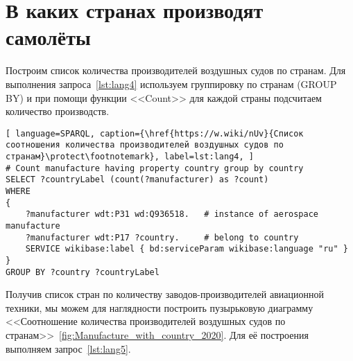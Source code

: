 \section{В каких странах производят самолёты}

Построим список количества производителей воздушных судов по странам. Для выполнения запроса~\ref{lst:lang4} используем группировку по странам (GROUP BY) и при помощи функции <<Count>> для каждой страны подсчитаем количество производств.

\label{aircraft_question_3}

\begin{lstlisting}[ language=SPARQL, caption={\href{https://w.wiki/nUv}{Список соотношения количества производителей воздушных судов по странам}\protect\footnotemark}, label=lst:lang4, ]
# Count manufacture having property country group by country
SELECT ?countryLabel (count(?manufacturer) as ?count)
WHERE
{
    ?manufacturer wdt:P31 wd:Q936518.   # instance of aerospace manufacture
    ?manufacturer wdt:P17 ?country.     # belong to country
    SERVICE wikibase:label { bd:serviceParam wikibase:language "ru" }
}
GROUP BY ?country ?countryLabel
\end{lstlisting}


Получив список стран по количеству заводов-производителей авиационной техники, мы можем для наглядности построить пузырьковую диаграмму <<Соотношение количества
производителей воздушных судов по странам>>~\ref{fig:Manufacture_with_country_2020}. Для её построения выполняем запрос~\ref{lst:lang5}.

